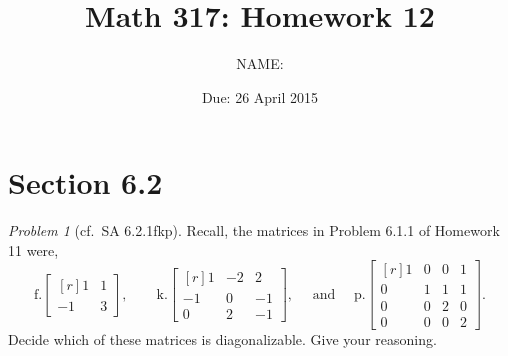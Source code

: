 \documentclass[fleqn,11pt]{paper}
\author         {NAME:                     }
\title{Math 317: Homework 12}
\date{Due: 26 April 2015}
\theoremstyle{remark}
\newtheorem{problem}{Problem}
\newtheorem*{solution}{{\bf Solution}}
\newcommand{\<}{\ensuremath{\langle}}
\renewcommand{\>}{\ensuremath{\rangle}}
\begin{document}
\maketitle


\section*{Section 6.2}
\begin{problem}[cf.~SA 6.2.1fkp]
Recall, the matrices in Problem 6.1.1 of Homework 11 were,
\[ \text{f.} \begin{bmatrix*}[r]1&1\\-1&3\end{bmatrix*}, \qquad
\text{k.} \begin{bmatrix*}[r]1&-2&2\\-1&0&-1\\0&2&-1\end{bmatrix*}, \quad \text{ and }\quad
\text{p.} \begin{bmatrix*}[r]1&0&0&1\\0&1&1&1\\0&0&2&0\\0&0&0&2\end{bmatrix*}.
\]
Decide which of these matrices is diagonalizable.  Give your reasoning.
\end{problem}
\newpage
\end{document}
